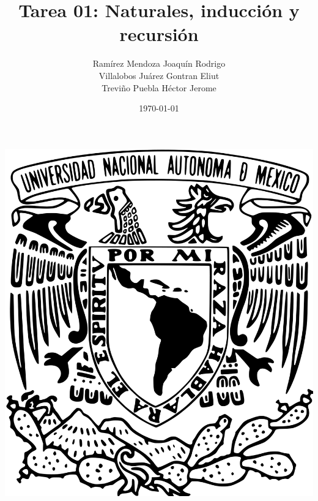 \documentclass[oneside]{book}
\title{Tarea 01: Naturales, inducción y recursión}
\author{Ramírez Mendoza Joaquín Rodrigo\\
Villalobos Juárez Gontran Eliut\\
Treviño Puebla Héctor Jerome}
\date{\today}
\begin{document}
    \begin{titlepage}

    \begin{minipage}{3cm}
    	\begin{center}
    		\includegraphics[height = 0.14\textheight]{recursos/Logo_UNAM.png}\par
    	\end{center}
    \end{minipage}\hfill
    \begin{minipage}{10cm}
    	

\end{minipage}
\end{titlepage}
\end{document}
